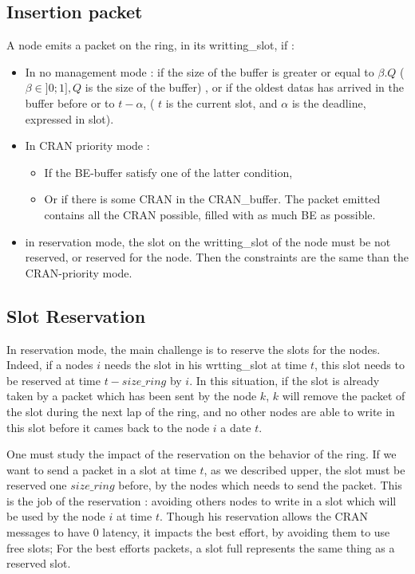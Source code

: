 \documentclass[a4paper,10pt]{article}
\begin{document}
	\subsection{Insertion packet}
	A node emits a packet on the ring, in its writting\_slot, if :
\begin{itemize}
\item In no management mode :  if the size of the buffer is greater or equal to $\beta .Q $ ($\beta \in ]0;1] , Q$ is the size of the buffer) , or if the oldest datas has arrived in the buffer before or to $t-\alpha$, ( $t$ is the current slot, and $\alpha$ is the deadline, expressed in slot).
\item In CRAN priority mode : 
	\begin{itemize}
	\item If the BE-buffer satisfy one of the latter condition,
	\item Or if there is some CRAN in the CRAN\_buffer. The packet emitted contains all the CRAN possible, filled with as much BE as possible. 
	\end{itemize}
\item in reservation mode, the slot on the writting\_slot of the node must be not reserved, or reserved for the node. Then the constraints are the same than the CRAN-priority mode.
\end{itemize} 	
\subsection{Slot Reservation}
In reservation mode, the main challenge is to reserve the slots for the nodes. Indeed, if a nodes $i$ needs the slot in his wrtting\_slot at time $t$, this slot needs to be reserved at time $t - size\_ring$ by $i$. In this situation, if the slot is already taken by a packet which has been sent by the node $k$, $k$ will remove the packet of the slot during the next lap of the ring, and no other nodes are able to write in this slot before it cames back to the node $i$ a date $t$.

One must study the impact of the reservation on the behavior of the ring. If we want to send a packet in a slot at time $t$, as we described upper, the slot must be reserved one $size\_ring$ before, by the nodes which needs to send the packet. This is the job of the reservation : avoiding others nodes to write in a slot which will be used by the node $i$ at time $t$. Though his reservation allows the CRAN messages to have 0 latency, it impacts the best effort, by avoiding them to use free slots; For the best efforts packets, a slot full represents the same thing as a reserved slot.
\end{document}
